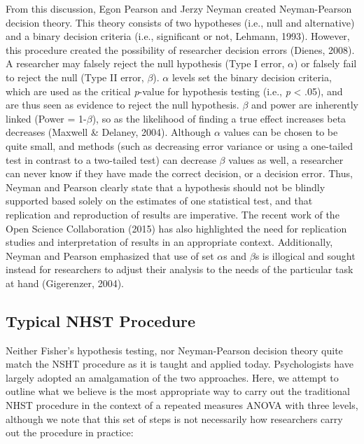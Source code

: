 \documentclass[english,mask,man]{apa6}
\theoremstyle{definition}
\theoremstyle{definition}
\theoremstyle{definition}
\theoremstyle{remark}
\begin{document}
From this discussion, Egon Pearson and Jerzy Neyman created
Neyman-Pearson decision theory. This theory consists of two hypotheses
(i.e., null and alternative) and a binary decision criteria (i.e.,
significant or not, Lehmann, 1993). However, this procedure created the
possibility of researcher decision errors (Dienes, 2008). A researcher
may falsely reject the null hypothesis (Type I error, \(\alpha\)) or
falsely fail to reject the null (Type II error, \(\beta\)). \(\alpha\)
levels set the binary decision criteria, which are used as the critical
\emph{p}-value for hypothesis testing (i.e., \emph{p} \textless{} .05),
and are thus seen as evidence to reject the null hypothesis. \(\beta\)
and power are inherently linked (Power = 1-\(\beta\)), so as the
likelihood of finding a true effect increases beta decreases (Maxwell \&
Delaney, 2004). Although \(\alpha\) values can be chosen to be quite
small, and methods (such as decreasing error variance or using a
one-tailed test in contrast to a two-tailed test) can decrease \(\beta\)
values as well, a researcher can never know if they have made the
correct decision, or a decision error. Thus, Neyman and Pearson clearly
state that a hypothesis should not be blindly supported based solely on
the estimates of one statistical test, and that replication and
reproduction of results are imperative. The recent work of the Open
Science Collaboration (2015) has also highlighted the need for
replication studies and interpretation of results in an appropriate
context. Additionally, Neyman and Pearson emphasized that use of set
\(\alpha\)s and \(\beta\)s is illogical and sought instead for
researchers to adjust their analysis to the needs of the particular task
at hand (Gigerenzer, 2004).

\subsection{Typical NHST Procedure}\label{typical-nhst-procedure}

Neither Fisher's hypothesis testing, nor Neyman-Pearson decision theory
quite match the NSHT procedure as it is taught and applied today.
Psychologists have largely adopted an amalgamation of the two
approaches. Here, we attempt to outline what we believe is the most
appropriate way to carry out the traditional NHST procedure in the
context of a repeated measures ANOVA with three levels, although we note
that this set of steps is not necessarily how researchers carry out the
procedure in practice:
\end{document}
